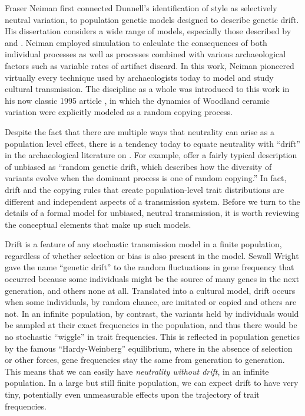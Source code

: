 Fraser Neiman \citeyearpar{Neiman1990} first connected Dunnell's identification of style as selectively neutral variation, to population genetic models designed to describe genetic drift.  His dissertation considers a wide range of \ct models, especially those described by \citet{cavalli1973cultural,cavalli1973models,CF1981} and \citet{BR1985}.  Neiman employed simulation to calculate the consequences of both individual processes as well as processes combined with various archaeological factors such as variable rates of artifact discard.  In this work, Neiman pioneered virtually every technique used by archaeologists today to model and study cultural transmission.  The discipline as a whole was introduced to this work in his now classic 1995 article \citep{Neiman1995}, in which the dynamics of Woodland ceramic variation were explicitly modeled as a random copying process.  


Despite the fact that there are multiple ways that neutrality can arise as a population level effect, there is a tendency today to equate neutrality with ``drift'' in the archaeological literature on \ct.   For example, \citet[][p.1443]{bentley2004random} offer a fairly typical description of unbiased \ct as  ``random genetic drift, which describes how the diversity of variants evolve when the dominant process is one of random copying.''  In fact, drift and the copying rules that create population-level trait distributions are different and independent aspects of a transmission system.   Before we turn to the details of a formal model for unbiased, neutral transmission, it is worth reviewing the conceptual elements that make up such models.  


Drift is a feature of any stochastic transmission model in a finite population, regardless of whether selection or bias is also present in the model.   Sewall Wright gave the name ``genetic drift'' to the random fluctuations in gene frequency that occurred because some individuals might be the source of many genes in the next generation, and others none at all.  Translated into a cultural model, drift occurs when some individuals, by random chance, are imitated or copied and others are not.  In an infinite population, by contrast, the variants held by individuals would be sampled at their exact frequencies in the population, and thus there would be no stochastic ``wiggle'' in trait frequencies.  This is reflected in population genetics by the famous ``Hardy-Weinberg'' equilibrium, where in the absence of selection or other forces, gene frequencies stay the same from generation to generation.    This means that we can easily have \emph{neutrality without drift}, in an infinite population.  In a large but still finite population, we can expect drift to have very tiny, potentially even unmeasurable effects upon the trajectory of trait frequencies.   

